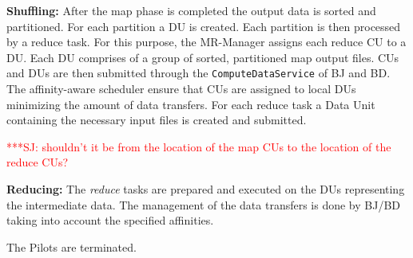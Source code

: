 \documentclass{acm_proc_article-sp}
\newcommand{\jhanote}[1]{ {\textcolor{red} { ***SJ: #1 }}}
\newcommand{\alnote}[1]{ {\textcolor{blue} { ***andreL: #1 }}}
\newcommand{\pnote}[1]{ {\textcolor{magenta} { ***pradeep: #1 }}}
\newcommand{\alnote}[1]{}
\newcommand{\pnote}[1]{}
\newcommand{\jhanote}[1]{}
\newcommand{\upp}{\vspace*{-0.5em}}
\newcommand{\pilots}{Pilots\xspace}
\newcommand{\mrmg}{MR-Manager\xspace}
\newcommand{\cus}{CUs\xspace}
\newcommand{\du}{DU\xspace}
\newcommand{\dus}{DUs\xspace}
\begin{document}
\begin{compactenum}[A.]
\item \textbf{Shuffling:} %
  After the map phase is completed the output data is sorted and
  partitioned. For each partition a \du is created. Each partition is
  then processed by a reduce task. For this purpose, the \mrmg assigns
  each reduce CU to a DU. Each DU comprises of a group of sorted,
  partitioned map output files. \cus and \dus are then submitted
  through the \texttt{ComputeDataService} of BJ and BD. The
  affinity-aware scheduler ensure that \cus are assigned to local \dus
  minimizing the amount of data transfers. 	For each reduce task a 
  Data Unit containing the necessary input files is created and submitted. %

\jhanote{shouldn't it
    be from the location of the map CUs to the location of the reduce
    CUs?} 
		
	
\item \textbf{Reducing:} The {\it reduce} tasks are prepared and
  executed on the DUs representing the intermediate data.
  The management of the data transfers is done by BJ/BD taking into account the 
  specified affinities.
	
\item The \pilots are terminated.

\end{compactenum}
\upp
\end{document}
